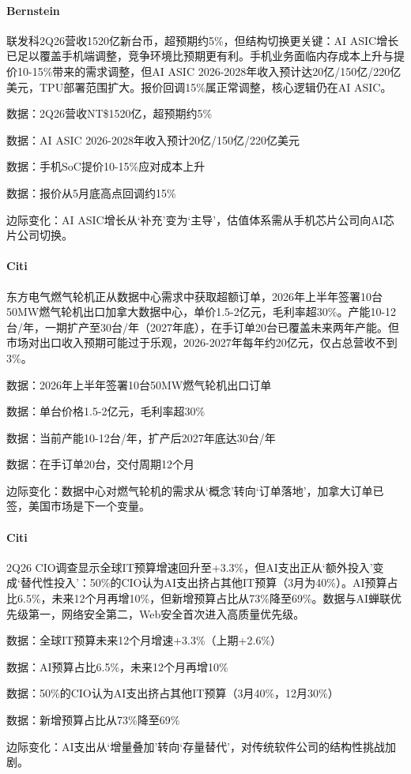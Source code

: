 \documentclass[11pt]{ctexart}
\begin{document}
\paragraph{Bernstein} 联发科2Q26营收1520亿新台币，超预期约5\%，但结构切换更关键：AI ASIC增长已足以覆盖手机端调整，竞争环境比预期更有利。手机业务面临内存成本上升与提价10-15\%带来的需求调整，但AI ASIC 2026-2028年收入预计达20亿/150亿/220亿美元，TPU部署范围扩大。报价回调15\%属正常调整，核心逻辑仍在AI ASIC。
{\small\color{refgray}数据：2Q26营收NT\$1520亿，超预期约5\%\par}
{\small\color{refgray}数据：AI ASIC 2026-2028年收入预计20亿/150亿/220亿美元\par}
{\small\color{refgray}数据：手机SoC提价10-15\%应对成本上升\par}
{\small\color{refgray}数据：报价从5月底高点回调约15\%\par}
{\small\color{refgray}边际变化：AI ASIC增长从‘补充’变为‘主导’，估值体系需从手机芯片公司向AI芯片公司切换。\par}
\paragraph{Citi} 东方电气燃气轮机正从数据中心需求中获取超额订单，2026年上半年签署10台50MW燃气轮机出口加拿大数据中心，单价1.5-2亿元，毛利率超30\%。产能10-12台/年，一期扩产至30台/年（2027年底），在手订单20台已覆盖未来两年产能。但市场对出口收入预期可能过于乐观，2026-2027年每年约20亿元，仅占总营收不到3\%。
{\small\color{refgray}数据：2026年上半年签署10台50MW燃气轮机出口订单\par}
{\small\color{refgray}数据：单台价格1.5-2亿元，毛利率超30\%\par}
{\small\color{refgray}数据：当前产能10-12台/年，扩产后2027年底达30台/年\par}
{\small\color{refgray}数据：在手订单20台，交付周期12个月\par}
{\small\color{refgray}边际变化：数据中心对燃气轮机的需求从‘概念’转向‘订单落地’，加拿大订单已签，美国市场是下一个变量。\par}
\paragraph{Citi} 2Q26 CIO调查显示全球IT预算增速回升至+3.3\%，但AI支出正从‘额外投入’变成‘替代性投入’：50\%的CIO认为AI支出挤占其他IT预算（3月为40\%）。AI预算占比6.5\%，未来12个月再增10\%，但新增预算占比从73\%降至69\%。数据与AI蝉联优先级第一，网络安全第二，Web安全首次进入高质量优先级。
{\small\color{refgray}数据：全球IT预算未来12个月增速+3.3\%（上期+2.6\%）\par}
{\small\color{refgray}数据：AI预算占比6.5\%，未来12个月再增10\%\par}
{\small\color{refgray}数据：50\%的CIO认为AI支出挤占其他IT预算（3月40\%，12月30\%）\par}
{\small\color{refgray}数据：新增预算占比从73\%降至69\%\par}
{\small\color{refgray}边际变化：AI支出从‘增量叠加’转向‘存量替代’，对传统软件公司的结构性挑战加剧。\par}
\end{document}
